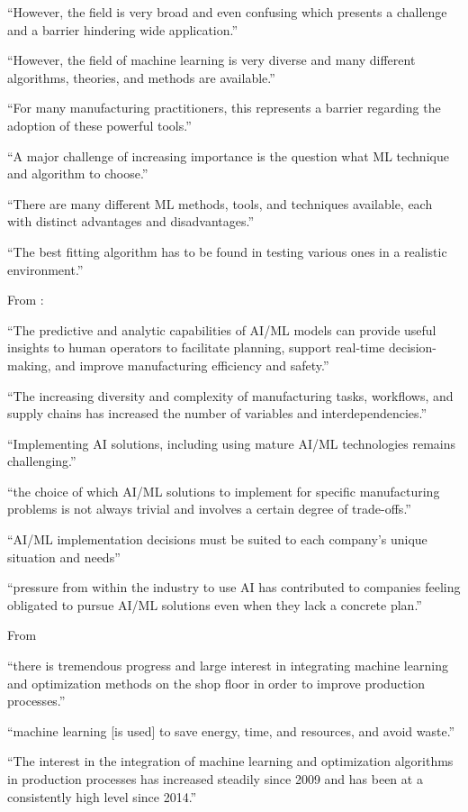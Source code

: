 “However, the field is very broad and even confusing which presents a challenge and a barrier hindering wide application.”

“However, the field of machine learning is very diverse and many different algorithms, theories, and methods are available.”

“For many manufacturing practitioners, this represents a barrier regarding the adoption of these powerful tools.”

“A major challenge of increasing importance is the question what ML technique and algorithm to choose.”

“There are many different ML methods, tools, and techniques available, each with distinct advantages and disadvantages.”

“The best fitting algorithm has to be found in testing various ones in a realistic environment.”


From \parencite{plathottam2023review_ai_manufacturing} :

“The predictive and analytic capabilities of AI/ML models can provide useful insights to human operators to facilitate planning, support real-time decision-making, and improve manufacturing efficiency and safety.”

“The increasing diversity and complexity of manufacturing tasks, workflows, and supply chains has increased the number of variables and interdependencies.”

“Implementing AI solutions, including using mature AI/ML technologies remains challenging.”

“the choice of which AI/ML solutions to implement for specific manufacturing problems is not always trivial and involves a certain degree of trade-offs.”

“AI/ML implementation decisions must be suited to each company's unique situation and needs”

“pressure from within the industry to use AI has contributed to companies feeling obligated to pursue AI/ML solutions even when they lack a concrete plan.”


From \parencite{weichert2019review_ml_optimization_production}

“there is tremendous progress and large interest in integrating machine learning and optimization methods on the shop floor in order to improve production processes.”

“machine learning [is used] to save energy, time, and resources, and avoid waste.”

“The interest in the integration of machine learning and optimization algorithms in production processes has increased steadily since 2009 and has been at a consistently high level since 2014.”

